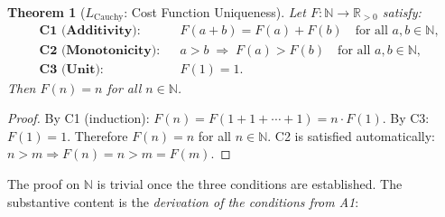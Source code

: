 \documentclass[11pt,a4paper]{article}
\newtheorem{theorem}{Theorem}[section]
\theoremstyle{definition}
\begin{document}
\begin{theorem}[$L_{\mathrm{Cauchy}}$: Cost Function Uniqueness]\label{thm:LCauchy}
Let $F: \mathbb{N} \to \mathbb{R}_{>0}$ satisfy:
\begin{align}
  &\textbf{C1 (Additivity):}  &&F(a + b) = F(a) + F(b)
    \quad \text{for all } a, b \in \mathbb{N}, \label{eq:C1_supp} \\
  &\textbf{C2 (Monotonicity):} &&a > b \;\Rightarrow\; F(a) > F(b)
    \quad \text{for all } a, b \in \mathbb{N}, \label{eq:C2_supp} \\
  &\textbf{C3 (Unit):}          &&F(1) = 1. \label{eq:C3_supp}
\end{align}
Then $F(n) = n$ for all $n \in \mathbb{N}$.
\end{theorem}

\begin{proof}
By C1 (induction): $F(n) = F(1 + 1 + \cdots + 1) = n \cdot F(1)$.
By C3: $F(1) = 1$.  Therefore $F(n) = n$ for all $n \in \mathbb{N}$.
C2 is satisfied automatically: $n > m \Rightarrow F(n) = n > m = F(m)$.
\end{proof}

\noindent The proof on $\mathbb{N}$ is trivial once the three conditions
are established.  The substantive content is the \emph{derivation of the
conditions from A1}:
\end{document}
